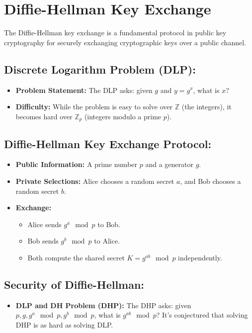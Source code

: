 \documentclass[12pt]{article}
\begin{document}
\section*{Diffie-Hellman Key Exchange}

The Diffie-Hellman key exchange is a fundamental protocol in public key cryptography for securely exchanging cryptographic keys over a public channel.

\subsection*{Discrete Logarithm Problem (DLP):}
\begin{itemize}
    \item \textbf{Problem Statement:} The DLP asks: given \( g \) and \( y = g^x \), what is \( x \)?
    \item \textbf{Difficulty:} While the problem is easy to solve over \( \mathbb{Z} \) (the integers), it becomes hard over \( \mathbb{Z}_p \) (integers modulo a prime \( p \)).
\end{itemize}

\subsection*{Diffie-Hellman Key Exchange Protocol:}
\begin{itemize}
    \item \textbf{Public Information:} A prime number \( p \) and a generator \( g \).
    \item \textbf{Private Selections:} Alice chooses a random secret \( a \), and Bob chooses a random secret \( b \).
    \item \textbf{Exchange:}
    \begin{itemize}
        \item Alice sends \( g^a \mod p \) to Bob.
        \item Bob sends \( g^b \mod p \) to Alice.
        \item Both compute the shared secret \( K = g^{ab} \mod p \) independently.
    \end{itemize}
\end{itemize}

\subsection*{Security of Diffie-Hellman:}
\begin{itemize}
    \item \textbf{DLP and DH Problem (DHP):} The DHP asks: given \( p, g, g^a \mod p, g^b \mod p \), what is \( g^{ab} \mod p \)? It's conjectured that solving DHP is as hard as solving DLP.
\end{itemize}
\end{document}
